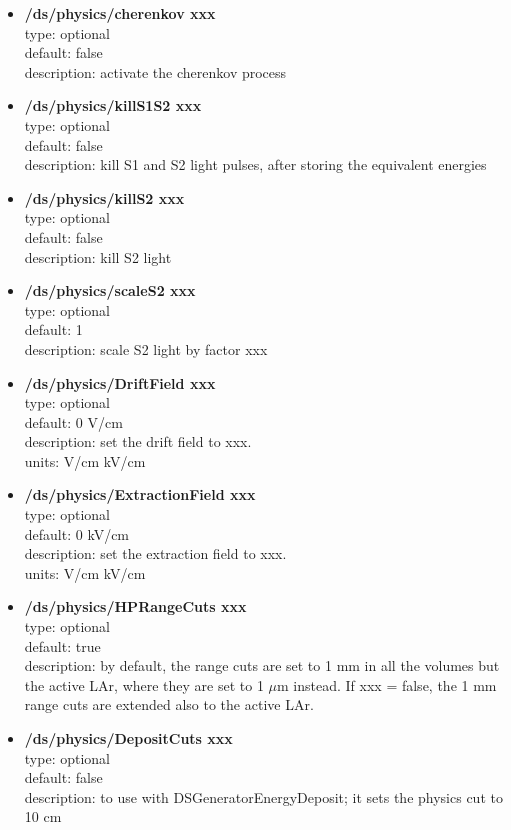 \documentclass[twocolumn, 10pt]{article}
\begin{document}
\begin{itemize}
\item \textbf{/ds/physics/cherenkov xxx}\\
type: optional \\
default: false\\
description: activate the cherenkov process \\


\item \textbf{/ds/physics/killS1S2 xxx}\\
type: optional \\
default: false\\
description: kill S1 and S2 light pulses, after storing the equivalent energies\\

\item \textbf{/ds/physics/killS2 xxx}\\
type: optional \\
default: false\\
description: kill S2 light\\

\item \textbf{/ds/physics/scaleS2 xxx}\\
type: optional \\
default: 1\\
description: scale S2 light by factor xxx\\

\item \textbf{/ds/physics/DriftField xxx}\\
type: optional\\
default: 0 V/cm\\
description: set the drift field to xxx. \\
units: V/cm  kV/cm

\item \textbf{/ds/physics/ExtractionField xxx}\\
type: optional\\
default: 0 kV/cm\\
description: set the extraction field to xxx. \\
units: V/cm  kV/cm

\item \textbf{/ds/physics/HPRangeCuts xxx}\\
type: optional \\
default: true\\
description: by default, the range cuts are set to 1 mm in all the volumes but the active LAr, where they are set to 1 $\mu$m instead. 
If xxx = false, the 1 mm range cuts are extended also to the active LAr.

\item \textbf{/ds/physics/DepositCuts xxx}\\
type: optional \\
default: false\\
description: to use with DSGeneratorEnergyDeposit; it sets the physics cut to 10 cm



\end{itemize}
\end{document}
